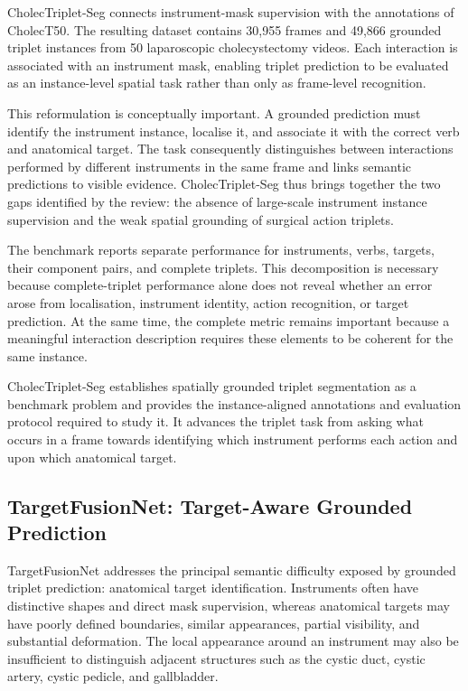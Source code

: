 CholecTriplet-Seg connects instrument-mask supervision with the \ivttriplet annotations of CholecT50. The resulting dataset contains 30,955 frames and 49,866 grounded triplet instances from 50 laparoscopic cholecystectomy videos. Each interaction is associated with an instrument mask, enabling triplet prediction to be evaluated as an instance-level spatial task rather than only as frame-level recognition.

This reformulation is conceptually important. A grounded prediction must identify the instrument instance, localise it, and associate it with the correct verb and anatomical target. The task consequently distinguishes between interactions performed by different instruments in the same frame and links semantic predictions to visible evidence. CholecTriplet-Seg thus brings together the two gaps identified by the review: the absence of large-scale instrument instance supervision and the weak spatial grounding of surgical action triplets.

The benchmark reports separate performance for instruments, verbs, targets, their component pairs, and complete triplets. This decomposition is necessary because complete-triplet performance alone does not reveal whether an error arose from localisation, instrument identity, action recognition, or target prediction. At the same time, the complete metric remains important because a meaningful interaction description requires these elements to be coherent for the same instance.

CholecTriplet-Seg establishes spatially grounded triplet segmentation as a benchmark problem and provides the instance-aligned annotations and evaluation protocol required to study it. It advances the triplet task from asking what occurs in a frame towards identifying which instrument performs each action and upon which anatomical target.

\subsection{TargetFusionNet: Target-Aware Grounded Prediction}
\label{sec:discussion-targetfusionnet}

TargetFusionNet addresses the principal semantic difficulty exposed by grounded triplet prediction: anatomical target identification. Instruments often have distinctive shapes and direct mask supervision, whereas anatomical targets may have poorly defined boundaries, similar appearances, partial visibility, and substantial deformation. The local appearance around an instrument may also be insufficient to distinguish adjacent structures such as the cystic duct, cystic artery, cystic pedicle, and gallbladder.

